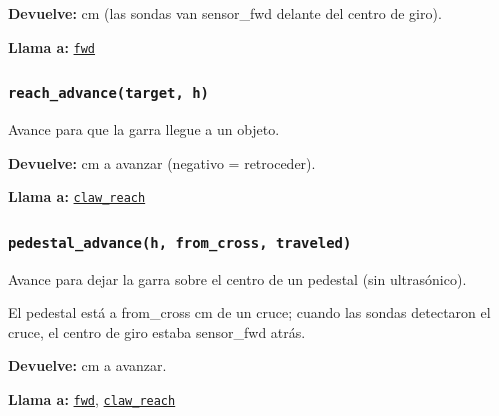 \noindent\textbf{Devuelve:} cm (las sondas van sensor\_fwd delante del centro de giro).\par
\noindent\textbf{Llama a:} \hyperref[fn:geometry:fwd]{\texttt{fwd}}\par

\subsubsection{\texttt{reach\_\allowbreak{}advance(target, h)}}\label{fn:geometry:reach-advance}
\noindent Avance para que la garra llegue a un objeto.

\par{}\par\smallskip
\noindent\textbf{Devuelve:} cm a avanzar (negativo = retroceder).\par
\noindent\textbf{Llama a:} \hyperref[fn:geometry:claw-reach]{\texttt{claw\_\allowbreak{}reach}}\par

\subsubsection{\texttt{pedestal\_\allowbreak{}advance(h, from\_\allowbreak{}cross, traveled)}}\label{fn:geometry:pedestal-advance}
\noindent Avance para dejar la garra sobre el centro de un pedestal (sin ultrasónico).

El pedestal está a from\_cross cm de un cruce; cuando las sondas detectaron el cruce, el centro de giro estaba sensor\_fwd atrás.

\par{}\par\smallskip
\noindent\textbf{Devuelve:} cm a avanzar.\par
\noindent\textbf{Llama a:} \hyperref[fn:geometry:fwd]{\texttt{fwd}}, \hyperref[fn:geometry:claw-reach]{\texttt{claw\_\allowbreak{}reach}}\par

